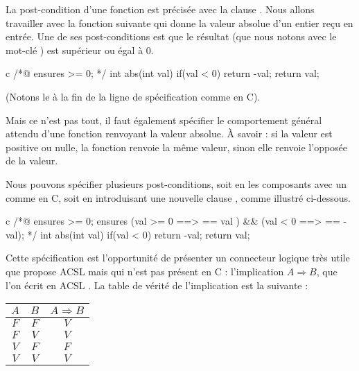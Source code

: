 

La post-condition d'une fonction est précisée avec la clause . 
Nous allons travailler avec la fonction suivante qui donne la valeur absolue
d'un entier reçu en entrée. 
Une de ses post-conditions est que le résultat (que nous notons avec le 
mot-clé ) est supérieur ou égal à 0.



\begin{CodeBlock}{c}
/*@
  ensures \result >= 0;
*/
int abs(int val){
  if(val < 0) return -val;
  return val;
}
\end{CodeBlock}



(Notons le \CodeInline{;} à la fin de la ligne de spécification comme en C).



Mais ce n'est pas tout, il faut également spécifier le comportement général 
attendu d'une fonction renvoyant la valeur absolue. À savoir : si la valeur
est positive ou nulle, la fonction renvoie la même valeur, sinon elle renvoie 
l'opposée de la valeur.



Nous pouvons spécifier plusieurs post-conditions, soit en les composants avec 
un \CodeInline{\&\&} comme en C, soit en introduisant une nouvelle clause , 
comme illustré ci-dessous.



\begin{CodeBlock}{c}
/*@
  ensures \result >= 0;
  ensures (val >= 0 ==> \result == val ) && 
          (val <  0 ==> \result == -val);
*/
int abs(int val){
  if(val < 0) return -val;
  return val;
}
\end{CodeBlock}



Cette spécification est l'opportunité de présenter un connecteur logique 
très utile que propose ACSL mais qui n'est pas présent en C : 
l'implication $A \Rightarrow B$, que l'on écrit en ACSL .
La table de vérité de l'implication est la suivante :



\begin{longtabu}{|c|c|c|} \hline
$A$ & $B$ & $A \Rightarrow B$ \\ \hline
$F$ & $F$ & $V$ \\ \hline
$F$ & $V$ & $V$ \\ \hline
$V$ & $F$ & $F$ \\ \hline
$V$ & $V$ & $V$ \\ \hline
\end{longtabu}



